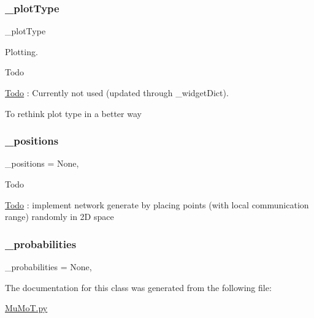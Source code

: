 \subsubsection{\texorpdfstring{\+\_\+plot\+Type}{\_plotType}}
{\footnotesize\ttfamily \+\_\+plot\+Type\hspace{0.3cm}{\ttfamily [private]}}



Plotting. 

\begin{DoxyRefDesc}{Todo}
\item[\hyperlink{todo__todo000048}{Todo}]\+: Currently not used (updated through \+\_\+widget\+Dict).\end{DoxyRefDesc}
To rethink plot type in a better way \mbox{\label{class_mu_mo_t_1_1_mu_mo_tmultiagent_view_a8be9986760a86837e04718906d18d596}} 
\subsubsection{\texorpdfstring{\+\_\+positions}{\_positions}}
{\footnotesize\ttfamily \+\_\+positions = None\hspace{0.3cm}{\ttfamily [static]}, {\ttfamily [private]}}

\begin{DoxyRefDesc}{Todo}
\item[\hyperlink{todo__todo000050}{Todo}]\+: implement network generate by placing points (with local communication range) randomly in 2D space \end{DoxyRefDesc}
\mbox{\label{class_mu_mo_t_1_1_mu_mo_tmultiagent_view_aaf2c34c5022e4e3c872dbee11e50ea9b}} 
\subsubsection{\texorpdfstring{\+\_\+probabilities}{\_probabilities}}
{\footnotesize\ttfamily \+\_\+probabilities = None\hspace{0.3cm}{\ttfamily [static]}, {\ttfamily [private]}}



The documentation for this class was generated from the following file\+:\begin{DoxyCompactItemize}
\item 
\hyperlink{_mu_mo_t_8py}{Mu\+Mo\+T.\+py}\end{DoxyCompactItemize}
